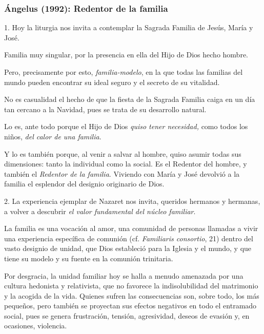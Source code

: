 			\subsubsection{Ángelus (1992): Redentor de la familia}
			
				
				\begin{body}
					1. Hoy la liturgia nos invita a contemplar la Sagrada Familia de Jesús, María y José.
					
					Familia muy singular, por la presencia en ella del Hijo de Dios hecho hombre.
					
					Pero, precisamente por esto, \emph{familia-modelo}, en la que todas las familias del mundo pueden encontrar su ideal seguro y el secreto de su vitalidad.
					
					No es casualidad el hecho de que la fiesta de la Sagrada Familia caiga en un día tan cercano a la Navidad, pues se trata de su desarrollo natural.
					
					Lo es, ante todo porque el Hijo de Dios \emph{quiso tener necesidad,} como todos los niños, \emph{del calor de una familia}.
					
					Y lo es también porque, al venir a salvar al hombre, quiso asumir todas sus dimensiones: tanto la individual como la social. Es el Redentor del hombre, y también el \emph{Redentor de la familia}. Viviendo con María y José devolvió a la familia el esplendor del designio originario de Dios.
					
					2. La experiencia ejemplar de Nazaret nos invita, queridos hermanos y hermanas, a volver a descubrir \emph{el valor fundamental del núcleo familiar}.
					
					La familia es una vocación al amor, una comunidad de personas llamadas a vivir una experiencia específica de comunión (cf. \emph{Familiaris consortio}, 21) dentro del vasto designio de unidad, que Dios estableció para la Iglesia y el mundo, y que tiene su modelo y su fuente en la comunión trinitaria.
					
					Por desgracia, la unidad familiar hoy se halla a menudo amenazada por una cultura hedonista y relativista, que no favorece la indisolubilidad del matrimonio y la acogida de la vida. Quienes sufren las consecuencias son, sobre todo, los más pequeños, pero también se proyectan sus efectos negativos en todo el entramado social, pues se genera frustración, tensión, agresividad, deseos de evasión y, en ocasiones, violencia.
					

\end{body}
